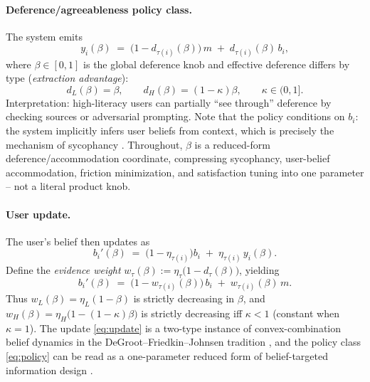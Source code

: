 \documentclass[11pt]{article}
\theoremstyle{definition}
\theoremstyle{remark}
\numberwithin{equation}{section}
\begin{document}
\paragraph{Deference/agreeableness policy class.} The system emits
\begin{equation}\label{eq:policy}
y_i(\beta) \;=\; \bigl(1 - d_{\tau(i)}(\beta)\bigr)\, m \;+\; d_{\tau(i)}(\beta)\, b_i,
\end{equation}
where $\beta \in [0,1]$ is the global deference knob and effective deference differs by type (\emph{extraction advantage}):
\begin{equation}\label{eq:deference}
d_L(\beta) = \beta, \qquad d_H(\beta) = (1-\kappa)\beta, \qquad \kappa \in (0,1].
\end{equation}
Interpretation: high-literacy users can partially ``see through'' deference by checking sources or adversarial prompting. Note that the policy conditions on $b_i$: the system implicitly infers user beliefs from context, which is precisely the mechanism of sycophancy \citep{perez2022discovering, sharma2024towards}. Throughout, $\beta$ is a reduced-form deference/accommodation coordinate, compressing sycophancy, user-belief accommodation, friction minimization, and satisfaction tuning into one parameter -- not a literal product knob.

\paragraph{User update.} The user's belief then updates as
\begin{equation}\label{eq:update}
b_i'(\beta) \;=\; \bigl(1 - \eta_{\tau(i)}\bigr) b_i \;+\; \eta_{\tau(i)}\, y_i(\beta).
\end{equation}
Define the \emph{evidence weight} $w_\tau(\beta) := \eta_\tau \bigl(1 - d_\tau(\beta)\bigr)$, yielding
\begin{equation}\label{eq:weightform}
b_i'(\beta) \;=\; \bigl(1 - w_{\tau(i)}(\beta)\bigr)\, b_i \;+\; w_{\tau(i)}(\beta)\, m.
\end{equation}
Thus $w_L(\beta) = \eta_L(1-\beta)$ is strictly decreasing in $\beta$, and $w_H(\beta) = \eta_H\bigl(1-(1-\kappa)\beta\bigr)$ is strictly decreasing iff $\kappa < 1$ (constant when $\kappa = 1$). The update \eqref{eq:update} is a two-type instance of convex-combination belief dynamics in the DeGroot--Friedkin--Johnsen tradition \citep{degroot1974reaching, friedkin1990social, golub2010naive}, and the policy class \eqref{eq:policy} can be read as a one-parameter reduced form of belief-targeted information design \citep{kamenica2011bayesian}.
\end{document}
